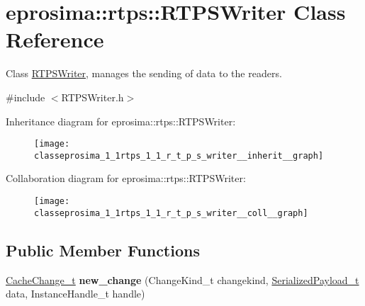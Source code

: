 \hypertarget{classeprosima_1_1rtps_1_1_r_t_p_s_writer}{\section{eprosima\-:\-:rtps\-:\-:\-R\-T\-P\-S\-Writer \-Class \-Reference}
\label{classeprosima_1_1rtps_1_1_r_t_p_s_writer}
}


\-Class \hyperlink{classeprosima_1_1rtps_1_1_r_t_p_s_writer}{\-R\-T\-P\-S\-Writer}, manages the sending of data to the readers.  




{\ttfamily \#include $<$\-R\-T\-P\-S\-Writer.\-h$>$}



\-Inheritance diagram for eprosima\-:\-:rtps\-:\-:\-R\-T\-P\-S\-Writer\-:\nopagebreak
\begin{figure}[H]
\begin{center}
\leavevmode
\texttt{[image: classeprosima\_1\_1rtps\_1\_1\_r\_t\_p\_s\_writer\_\_inherit\_\_graph]}
\end{center}
\end{figure}


\-Collaboration diagram for eprosima\-:\-:rtps\-:\-:\-R\-T\-P\-S\-Writer\-:
\nopagebreak
\begin{figure}[H]
\begin{center}
\leavevmode
\texttt{[image: classeprosima\_1\_1rtps\_1\_1\_r\_t\_p\_s\_writer\_\_coll\_\_graph]}
\end{center}
\end{figure}
\subsection*{\-Public \-Member \-Functions}
\begin{DoxyCompactItemize}
\item 
\hypertarget{classeprosima_1_1rtps_1_1_r_t_p_s_writer_a05feed92d15b97a5803aa416b0e064ba}{\hyperlink{structeprosima_1_1rtps_1_1_cache_change__t}{\-Cache\-Change\-\_\-t} {\bfseries new\-\_\-change} (\-Change\-Kind\-\_\-t changekind, \hyperlink{structeprosima_1_1rtps_1_1_serialized_payload__t}{\-Serialized\-Payload\-\_\-t} data, \-Instance\-Handle\-\_\-t handle)}\label{classeprosima_1_1rtps_1_1_r_t_p_s_writer_a05feed92d15b97a5803aa416b0e064ba}

\end{DoxyCompactItemize}
